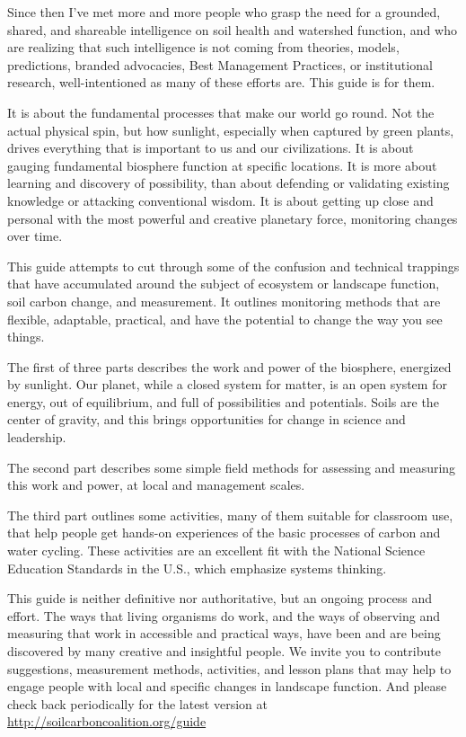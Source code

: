 \documentclass[11pt,letterpaper,twoside,onecolumn]{memoir}
\begin{document}
Since then I've met more and more people who grasp the need for a grounded, shared, and shareable intelligence on soil health and watershed function, and who are realizing that such intelligence is not coming from theories, models, predictions, branded advocacies, Best Management Practices, or institutional research, well-intentioned as many of these efforts are. This guide is for them.

It is about the fundamental processes that make our world go round. Not the actual physical spin, but how sunlight, especially when captured by green plants, drives everything that is important to us and our civilizations. It is about gauging fundamental biosphere function at specific locations. It is more about learning and discovery of possibility, than about defending or validating existing knowledge or attacking conventional wisdom. It is about getting up close and personal with the most powerful and creative planetary force, monitoring changes over time.

This guide attempts to cut through some of the confusion and technical trappings that have accumulated around the subject of ecosystem or landscape function, soil carbon change, and measurement. It outlines monitoring methods that are flexible, adaptable, practical, and have the potential to change the way you see things.

The first of three parts describes the work and power of the biosphere, energized by sunlight. Our planet, while a closed system for matter, is an open system for energy, out of equilibrium, and full of possibilities and potentials. Soils are the center of gravity, and this brings opportunities for change in science and leadership.

The second part describes some simple field methods for assessing and measuring this work and power, at local and management scales.

The third part outlines some activities, many of them suitable for classroom use, that help people get hands-on experiences of the basic processes of carbon and water cycling. These activities are an excellent fit with the National Science Education Standards in the U.S., which emphasize systems thinking.

 
This guide is neither definitive nor authoritative, but an ongoing process and effort. The ways that living organisms do work, and the ways of observing and measuring that work in accessible and practical ways, have been and are being discovered by many creative and insightful people. We invite you to contribute suggestions, measurement methods, activities, and lesson plans that may help to engage people with local and specific changes in landscape function. And please check back periodically for the latest version at \url{http://soilcarboncoalition.org/guide}
\end{document}
